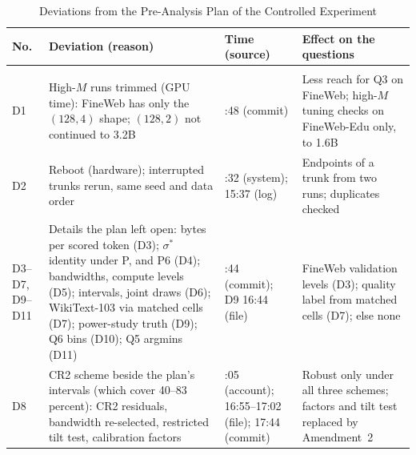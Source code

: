 \begin{table}[p]
\centering
\caption{Deviations from the Pre-Analysis Plan of the Controlled Experiment}
\label{tab:app-deviations}
\scriptsize
\setlength{\tabcolsep}{2.5pt}
\renewcommand{\arraystretch}{0.96}
\begin{tabular}{@{}>{\raggedright\arraybackslash}p{}>{\raggedright\arraybackslash}p{}>{\raggedright\arraybackslash}p{}>{\raggedright\arraybackslash}p{}@{}}
\toprule
No. & Deviation (reason) & Time (source) & Effect on the questions \\
\midrule
\multicolumn{4}{@{}l}{\textit{Panel A. Departures from the plan}}\\[1pt]
D1 & High-$M$ runs trimmed (GPU time): FineWeb has only the $(128,4)$ shape; $(128,2)$ not continued to 3.2B & 07:48 (commit) & Less reach for Q3 on FineWeb; high-$M$ tuning checks on FineWeb-Edu only, to 1.6B \\
D2 & Reboot (hardware); interrupted trunks rerun, same seed and data order & 15:32 (system); 15:37 (log) & Endpoints of a trunk from two runs; duplicates checked \\
D3--D7, D9--D11 & Details the plan left open: bytes per scored token (D3); $\sigma^*$ identity under P, and P6 (D4); bandwidths, compute levels (D5); intervals, joint draws (D6); WikiText-103 via matched cells (D7); power-study truth (D9); Q6 bins (D10); Q5 argmins (D11) & 17:44 (commit); D9 16:44 (file) & FineWeb validation levels (D3); quality label from matched cells (D7); else none \\
D8 & CR2 scheme beside the plan's intervals (which cover 40--83 percent): CR2 residuals, bandwidth re-selected, restricted tilt test, calibration factors & 17:05 (account); 16:55--17:02 (file); 17:44 (commit) & Robust only under all three schemes; factors and tilt test replaced by Amendment~2 \\

\end{tabular}
\end{table}
